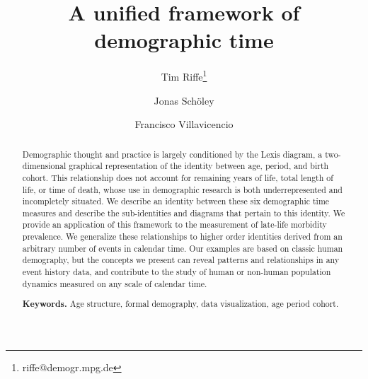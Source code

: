 \documentclass[12pt,oneside,a4paper]{article} %
\theoremstyle{definition}
\newcommand\ackn[1]{%
  \begingroup
  \renewcommand\thefootnote{}\footnote{#1}%
  \addtocounter{footnote}{-1}%
  \endgroup
}
\begin{document}
\title{A unified framework of demographic time}
\author[1]{Tim Riffe\thanks{riffe@demogr.mpg.de}}
\author[2,3]{Jonas Sch{\"o}ley}
\author[2,4]{Francisco Villavicencio}

\maketitle
\pagebreak
\begin{abstract}
Demographic thought and practice is largely conditioned by the Lexis diagram,
a two-dimensional graphical representation of the identity between age,
period, and birth cohort. This relationship does not account for remaining years
of life, total length of life, or time of death, whose use in
demographic research is both underrepresented and incompletely situated. We
describe an identity between these six demographic time measures and describe
the sub-identities and diagrams that pertain to this identity. We provide an
application of this framework to the measurement of late-life morbidity prevalence. We generalize these relationships to higher order identities derived from an
arbitrary number of events in calendar time. Our examples are based on
classic human demography, but the concepts we present can reveal patterns and
relationships in any event history data, and contribute to the study of human or
non-human population dynamics measured on any scale of calendar time.

\smallskip
\noindent \textbf{Keywords.} Age structure, formal demography, data
visualization, age period cohort.%
\end{abstract}
\end{document}
